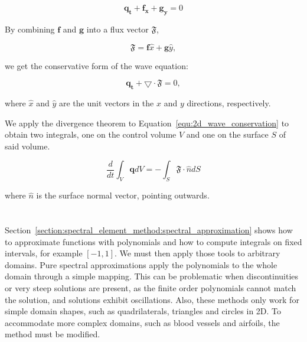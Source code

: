 \begin{equation}
	\mathbf{q_t} + \mathbf{f_x} + \mathbf{g_y} = 0
\end{equation}

By combining \(\mathbf{f}\) and \(\mathbf{g}\) into a flux vector \(\mathfrak{F}\), 

\begin{equation} \label{equ:2d_wave_fluxes}
	\mathfrak{F} = \mathbf{f}\widehat{x} + \mathbf{g}\widehat{y},
\end{equation}

\noindent
we get the conservative form of the wave equation:

\begin{equation} \label{equ:2d_wave_conservation}
	\mathbf{q_t} + \bigtriangledown \cdot \mathfrak{F} = 0,
\end{equation}

\noindent
where \(\widehat{x}\) and \(\widehat{y}\) are the unit vectors in the \(x\) and \(y\) directions,
respectively. 

We apply the divergence theorem to Equation~\ref{equ:2d_wave_conservation} to obtain two integrals,
one on the control volume \(V\) and one on the surface \(S\) of said volume.

\begin{equation} \label{equ:2d_wave_integral}
	\frac{d}{dt}\int_{V}\mathbf{q}dV = -\int_{S} \mathfrak{F} \cdot \widehat{n}dS
\end{equation}

\noindent
where \(\widehat{n}\) is the surface normal vector, pointing outwards.

\section{}\label{section:spectral_element_method:dg_sem}

Section~\ref{section:spectral_element_method:spectral_approximation} shows how to approximate
functions with polynomials and how to compute integrals on fixed intervals, for example \(\left[ -1,
1 \right]\). We must then apply those tools to arbitrary domains. Pure spectral approximations apply
the polynomials to the whole domain through a simple mapping. This can be problematic when
discontinuities or very steep solutions are present, as the finite order polynomials cannot match
the solution, and solutions exhibit oscillations. Also, these methods only work for simple domain
shapes, such as quadrilaterals, triangles and circles in 2D. To accommodate more complex domains,
such as blood vessels and airfoils, the method must be modified.

